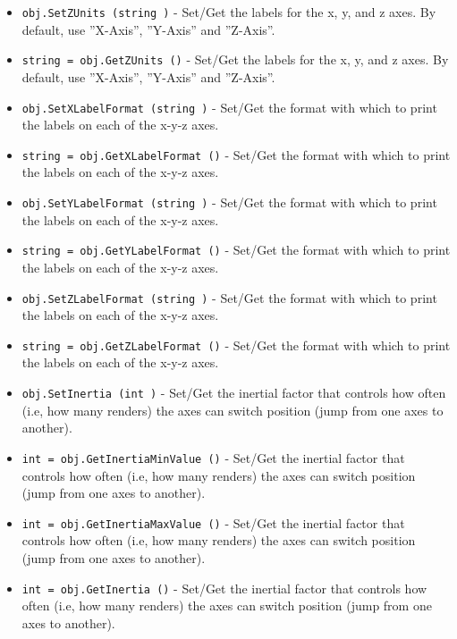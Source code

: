 \begin{itemize}
\item  \verb|obj.SetZUnits (string )| -  Set/Get the labels for the x, y, and z axes. By default, 
 use ''X-Axis'', ''Y-Axis'' and ''Z-Axis''.

\item  \verb|string = obj.GetZUnits ()| -  Set/Get the labels for the x, y, and z axes. By default, 
 use ''X-Axis'', ''Y-Axis'' and ''Z-Axis''.

\item  \verb|obj.SetXLabelFormat (string )| -  Set/Get the format with which to print the labels on each of the
 x-y-z axes.

\item  \verb|string = obj.GetXLabelFormat ()| -  Set/Get the format with which to print the labels on each of the
 x-y-z axes.

\item  \verb|obj.SetYLabelFormat (string )| -  Set/Get the format with which to print the labels on each of the
 x-y-z axes.

\item  \verb|string = obj.GetYLabelFormat ()| -  Set/Get the format with which to print the labels on each of the
 x-y-z axes.

\item  \verb|obj.SetZLabelFormat (string )| -  Set/Get the format with which to print the labels on each of the
 x-y-z axes.

\item  \verb|string = obj.GetZLabelFormat ()| -  Set/Get the format with which to print the labels on each of the
 x-y-z axes.

\item  \verb|obj.SetInertia (int )| -  Set/Get the inertial factor that controls how often (i.e, how
 many renders) the axes can switch position (jump from one axes 
 to another).

\item  \verb|int = obj.GetInertiaMinValue ()| -  Set/Get the inertial factor that controls how often (i.e, how
 many renders) the axes can switch position (jump from one axes 
 to another).

\item  \verb|int = obj.GetInertiaMaxValue ()| -  Set/Get the inertial factor that controls how often (i.e, how
 many renders) the axes can switch position (jump from one axes 
 to another).

\item  \verb|int = obj.GetInertia ()| -  Set/Get the inertial factor that controls how often (i.e, how
 many renders) the axes can switch position (jump from one axes 
 to another).


\end{itemize}
